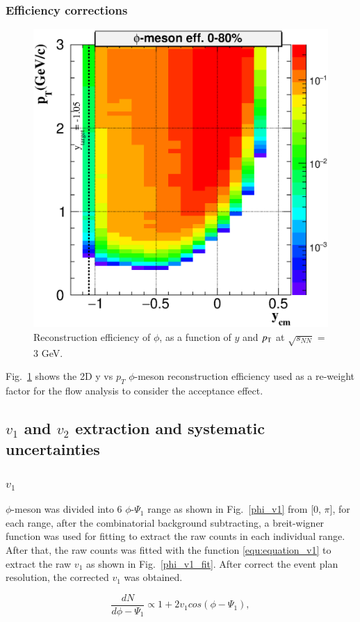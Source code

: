 \subsubsection{Efficiency corrections}

\begin{figure}[h]
\includegraphics[width=0.6\linewidth]{chapterY/fig/2effAll_rap_0.eps}
\caption{Reconstruction efficiency of $\phi$, as a function of $y$ and $p_{\rm{T}}$ at $\sqrt{s_{NN}}$ = 3 GeV.}
\label{phi_2Deff}
\end{figure}

Fig.~\ref{phi_2Deff} shows the 2D y vs $p_T$ $\phi$-meson reconstruction efficiency used as a re-weight factor for the flow analysis to consider the acceptance effect.


\subsection{$v_1$ and $v_2$ extraction and systematic uncertainties}

\subsubsection{$v_1$}

$\phi$-meson was divided into 6 $\phi$-$\Psi_{1}$ range as shown in Fig.~\ref{phi_v1} from [0, $\pi$], for each range, after the combinatorial background subtracting, a breit-wigner function was used for fitting to extract the raw counts in each individual range. After that, the raw counts was fitted with the function \ref{equ:equation_v1} to extract the raw $v_1$ as shown in Fig.~\ref{phi_v1_fit}. After correct the event plan resolution, the corrected $v_1$ was obtained.

\begin{equation}
  \frac{dN}{d\phi-\Psi_1} \propto 1+2v_1 cos(\phi-\Psi_{1}),
\label{equ:equation_v1}
\end{equation}


